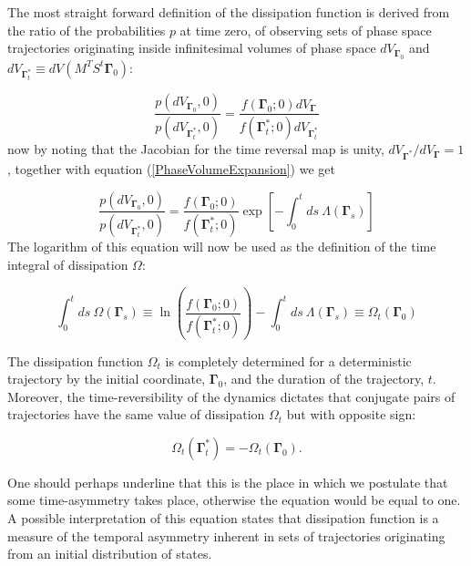 \documentclass[a4paper,12pt]{article}
\begin{document}
The most straight forward definition of the dissipation function is derived from the ratio of the probabilities $p$ at time zero, of observing sets of phase space trajectories originating inside infinitesimal volumes of phase space $dV_{\bm{\Gamma}_0}$ and $dV_{\bm{\Gamma}_t^*}\equiv d V(M^T S^t \bm{\Gamma}_0)$:

\begin{equation}
\label{ReversibilityEvans}
  \frac{p(d V_{\bm{\Gamma}_0}, 0)}{p(d V_{\bm{\Gamma}_t^*},0)}= 
  \frac{f(\bm{\Gamma}_0;0)d V_{\bm{\Gamma}}}{f(\bm{\Gamma}_t^*;0)d V_{\bm{\Gamma}_t^*}}
\end{equation}
now by noting that the Jacobian for the time reversal map is unity, $ d V_{\bm{\Gamma}^*}/ d V_{\bm{\Gamma}} =1 $, together with equation (\ref{PhaseVolumeExpansion}) we get


\begin{equation}
  \frac{p(d V_{\bm{\Gamma}_0}, 0)}{p(d V_{\bm{\Gamma}_t^*},0)}=
  \frac{f(\bm{\Gamma}_0;0)}{f(\bm{\Gamma}_t^*;0)} 
  \exp[-\int_0^t ds \ \Lambda(\bm{\Gamma}_s)]
\end{equation}
The logarithm of this equation will now be used as the definition of the time integral of dissipation $\Omega$:

\begin{equation}
  \label{Dissipation}
  \int_0^t ds\ \Omega(\bm{\Gamma}_s)\equiv \ln(\frac{f(\bm{\Gamma}_0;0)}{f(\bm{\Gamma}_t^*;0)}) -\int_0^t ds \ \Lambda(\bm{\Gamma}_s) \equiv \Omega_t(\bm{\Gamma}_0)
\end{equation}


The dissipation function $\Omega_t$ is completely determined for a deterministic trajectory by the initial coordinate, $\bm{\Gamma}_0$, and the duration of the trajectory, $t$. Moreover, the time-reversibility of the dynamics dictates that conjugate pairs of trajectories have the same value of dissipation $\Omega_t$ but with opposite sign:

\begin{equation}
  \Omega_t(\bm{\Gamma}_t^*)=-\Omega_t(\bm{\Gamma}_0).
\end{equation}


One should perhaps underline that this is the place in which we postulate that some time-asymmetry takes place, otherwise the equation \label{ReversibilityEvans} would be equal to one.
A possible interpretation of this equation states that dissipation function is a measure of the temporal asymmetry inherent in sets of trajectories originating from an initial distribution of states.
\end{document}
